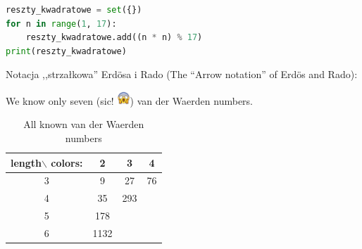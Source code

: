 \documentclass{beamer}
\begin{document}
\begin{frame}[fragile] %
  
\begin{lstlisting}[language=Python]
reszty_kwadratowe = set({})
for n in range(1, 17):
	reszty_kwadratowe.add((n * n) % 17)
print(reszty_kwadratowe)
\end{lstlisting}

\end{frame}

\begin{frame}
  \begin{block}{
    Notacja ,,strzałkowa'' Erd\"osa i Rado
    (The ``Arrow notation'' of Erd\"os and Rado):}
  \end{block}
\end{frame}

\begin{frame}
  \begin{block}{
    We know only seven (sic! \includegraphics[height=5mm]{krzyczacy.jpeg})
    van der Waerden numbers.}
   \end{block}

\begin{table}
  \centering
  \begin{tabular}{| c | c c c |}
    \hline 
     length$\backslash$ colors: & 2 & 3 & 4 \\
    \hline
    3 & 9 & 27 & 76 \\
    \hline
    4 & 35 & 293 &  \\
    \hline
    5 & 178 &  &  \\
    \hline
    6 & 1132 & & \\
    \hline
    \end{tabular}
  \caption{All known van der Waerden numbers}
\end{table}
\end{frame}
\end{document}
